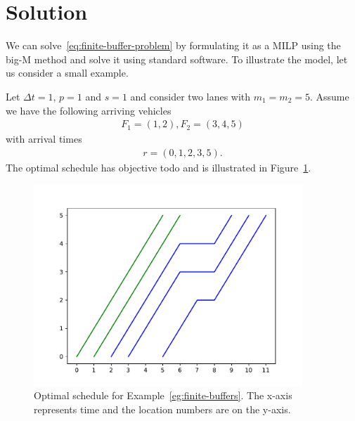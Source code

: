 \documentclass{article}
\theoremstyle{definition}
\theoremstyle{plain}
\begin{document}
\section{Solution}

We can solve~\eqref{eq:finite-buffer-problem} by formulating it as a MILP using
the big-M method and solve it using standard software. To illustrate the model,
let us consider a small example.

\begin{eg}
  \label{eg:finite-buffers}
  Let $\Delta t = 1$, $p = 1$ and $s = 1$ and consider two lanes with
  $m_{1} = m_{2} = 5$. Assume we have the following arriving vehicles
  \begin{align*}
    F_{1} = (1, 2) , F_{2} = (3, 4, 5)
  \end{align*}
  with arrival times
  \begin{align*}
    r = (0, 1, 2, 3, 5) .
  \end{align*}
  The optimal schedule has objective {\color{blue}todo} and is illustrated in
  Figure~\ref{fig:finite-buffer-example-schedule}.
\end{eg}

\begin{figure}
  \label{fig:finite-buffer-example-schedule}
  \includegraphics[width=0.9\textwidth]{figures/finite-buffer-schedule.pdf}
  \caption{Optimal schedule for Example~\ref{eg:finite-buffers}. The x-axis
    represents time and the location numbers are on the y-axis.}
\end{figure}
\end{document}
